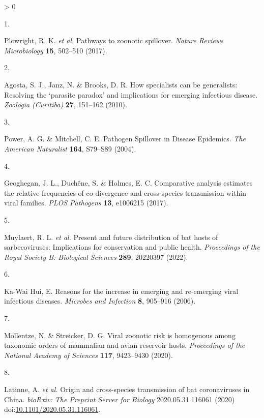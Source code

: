 \documentclass[10pt,oneside]{article}
\newlength{\cslhangindent}
\newlength{\csllabelwidth}
\newenvironment{CSLReferences}[3] %
 {%
  \setlength{\parindent}{0pt}
  \ifodd #1 \everypar{\setlength{\hangindent}{\cslhangindent}}\ignorespaces\fi
  \ifnum #2 > 0
  \setlength{\parskip}{#2\baselineskip}
  \fi
 }%
 {}
\newcommand{\CSLLeftMargin}[1]{\parbox[t]{\maxof{\widthof{#1}}{\csllabelwidth}}{#1}}
\newcommand{\CSLRightInline}[1]{\parbox[t]{\linewidth}{#1}}
\begin{document}
\hypertarget{refs}{}
\begin{CSLReferences}{0}{0}
\leavevmode\hypertarget{ref-Plowright2017Pathways}{}%
\CSLLeftMargin{1. }
\CSLRightInline{Plowright, R. K. \emph{et al.} Pathways to zoonotic
spillover. \emph{Nature Reviews Microbiology} \textbf{15}, 502--510
(2017).}

\leavevmode\hypertarget{ref-Agosta2010How}{}%
\CSLLeftMargin{2. }
\CSLRightInline{Agosta, S. J., Janz, N. \& Brooks, D. R. How specialists
can be generalists: Resolving the {`parasite paradox'} and implications
for emerging infectious disease. \emph{Zoologia (Curitiba)} \textbf{27},
151--162 (2010).}

\leavevmode\hypertarget{ref-Power2004Pathogen}{}%
\CSLLeftMargin{3. }
\CSLRightInline{Power, A. G. \& Mitchell, C. E. Pathogen Spillover in
Disease Epidemics. \emph{The American Naturalist} \textbf{164}, S79--S89
(2004).}

\leavevmode\hypertarget{ref-Geoghegan2017Comparative}{}%
\CSLLeftMargin{4. }
\CSLRightInline{Geoghegan, J. L., Duchêne, S. \& Holmes, E. C.
Comparative analysis estimates the relative frequencies of co-divergence
and cross-species transmission within viral families. \emph{PLOS
Pathogens} \textbf{13}, e1006215 (2017).}

\leavevmode\hypertarget{ref-Muylaert2022Present}{}%
\CSLLeftMargin{5. }
\CSLRightInline{Muylaert, R. L. \emph{et al.} Present and future
distribution of bat hosts of sarbecoviruses: Implications for
conservation and public health. \emph{Proceedings of the Royal Society
B: Biological Sciences} \textbf{289}, 20220397 (2022).}

\leavevmode\hypertarget{ref-Ka-WaiHui2006Reasons}{}%
\CSLLeftMargin{6. }
\CSLRightInline{Ka-Wai Hui, E. Reasons for the increase in emerging and
re-emerging viral infectious diseases. \emph{Microbes and Infection}
\textbf{8}, 905--916 (2006).}

\leavevmode\hypertarget{ref-Mollentze2020Viral}{}%
\CSLLeftMargin{7. }
\CSLRightInline{Mollentze, N. \& Streicker, D. G. Viral zoonotic risk is
homogenous among taxonomic orders of mammalian and avian reservoir
hosts. \emph{Proceedings of the National Academy of Sciences}
\textbf{117}, 9423--9430 (2020).}

\leavevmode\hypertarget{ref-Latinne2020Origin}{}%
\CSLLeftMargin{8. }
\CSLRightInline{Latinne, A. \emph{et al.} Origin and cross-species
transmission of bat coronaviruses in China. \emph{bioRxiv: The Preprint
Server for Biology} 2020.05.31.116061 (2020)
doi:\href{https://doi.org/10.1101/2020.05.31.116061}{10.1101/2020.05.31.116061}.}

\end{CSLReferences}
\end{document}
